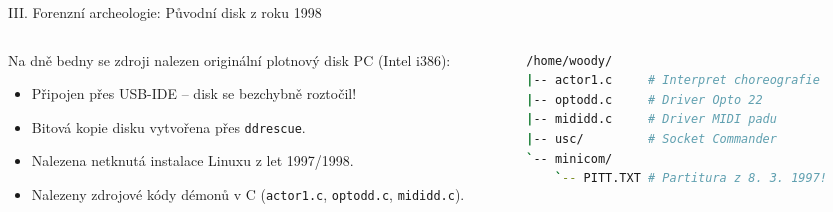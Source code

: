 \documentclass[aspectratio=169,11pt]{beamer}
\begin{document}
\begin{frame}[fragile]{III. Forenzní archeologie: Původní disk z roku 1998}
  \begin{columns}
    \begin{column}{0.5\textwidth}
      Na dně bedny se zdroji nalezen originální plotnový disk PC (Intel i386):
      \begin{itemize}
        \item Připojen přes USB-IDE – disk se bezchybně roztočil!
        \item Bitová kopie disku vytvořena přes \texttt{ddrescue}.
        \item Nalezena netknutá instalace Linuxu z let 1997/1998.
        \item Nalezeny zdrojové kódy démonů v C (\texttt{actor1.c}, \texttt{optodd.c}, \texttt{mididd.c}).
      \end{itemize}
    \end{column}
    \begin{column}{0.48\textwidth}
\begin{lstlisting}[language=bash,caption=Forenzní nález v adresáři]
/home/woody/
|-- actor1.c     # Interpret choreografie
|-- optodd.c     # Driver Opto 22
|-- mididd.c     # Driver MIDI padu
|-- usc/         # Socket Commander
`-- minicom/
    `-- PITT.TXT # Partitura z 8. 3. 1997!
\end{lstlisting}
    \end{column}
  \end{columns}
\end{frame}
\end{document}
